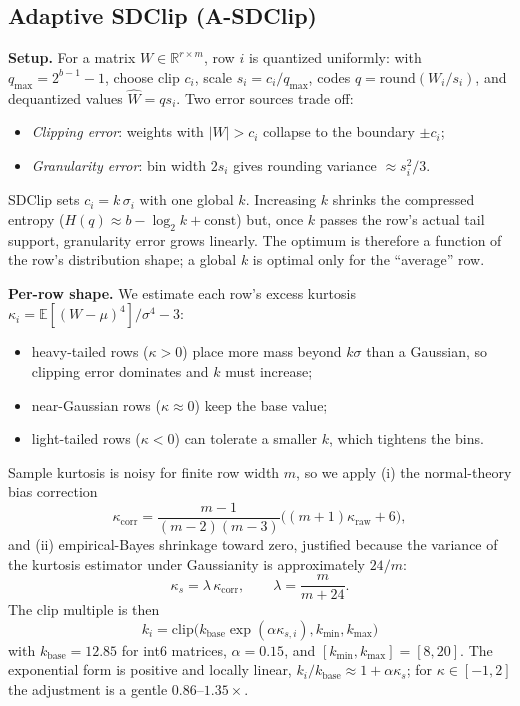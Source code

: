 \documentclass[10pt]{article}
\begin{document}
\subsection{Adaptive SDClip (A-SDClip)}

\textbf{Setup.} For a matrix $W\in\mathbb{R}^{r\times m}$, row $i$ is quantized
uniformly: with $q_{\max}=2^{b-1}-1$, choose clip $c_i$, scale
$s_i=c_i/q_{\max}$, codes $q=\mathrm{round}(W_i/s_i)$, and dequantized values
$\hat W=q s_i$. Two error sources trade off:
\begin{itemize}[leftmargin=1.6em,itemsep=0.05em]
\item \emph{Clipping error}: weights with $|W|>c_i$ collapse to the boundary $\pm c_i$;
\item \emph{Granularity error}: bin width $2s_i$ gives rounding variance $\approx s_i^2/3$.
\end{itemize}
SDClip sets $c_i=k\,\sigma_i$ with one global $k$. Increasing $k$ shrinks the compressed
entropy ($H(q)\approx b-\log_2 k+\text{const}$) but, once $k$ passes the row's actual tail
support, granularity error grows linearly. The optimum is therefore a function of the
row's distribution shape; a global $k$ is optimal only for the ``average'' row.

\textbf{Per-row shape.} We estimate each row's excess kurtosis
$\kappa_i=\mathbb{E}[(W-\mu)^4]/\sigma^4-3$:
\begin{itemize}[leftmargin=1.6em,itemsep=0.05em]
\item heavy-tailed rows ($\kappa>0$) place more mass beyond $k\sigma$ than a Gaussian, so
clipping error dominates and $k$ must increase;
\item near-Gaussian rows ($\kappa\approx 0$) keep the base value;
\item light-tailed rows ($\kappa<0$) can tolerate a smaller $k$, which tightens the bins.
\end{itemize}
Sample kurtosis is noisy for finite row width $m$, so we apply (i) the normal-theory bias
correction
\begin{equation}
\kappa_{\text{corr}}=\frac{m-1}{(m-2)(m-3)}\big((m+1)\kappa_{\text{raw}}+6\big),
\end{equation}
and (ii) empirical-Bayes shrinkage toward zero, justified because the variance of the
kurtosis estimator under Gaussianity is approximately $24/m$:
\begin{equation}
\kappa_s=\lambda\,\kappa_{\text{corr}},\qquad \lambda=\frac{m}{m+24}.
\end{equation}
The clip multiple is then
\begin{equation}
\boxed{\;k_i=\mathrm{clip}\big(k_{\text{base}}\exp(\alpha\kappa_{s,i}),
k_{\min},k_{\max}\big)\;}
\end{equation}
with $k_{\text{base}}=12.85$ for int6 matrices, $\alpha=0.15$, and $[k_{\min},k_{\max}]
=[8,20]$. The exponential form is positive and locally linear,
$k_i/k_{\text{base}}\approx 1+\alpha\kappa_s$; for $\kappa\in[-1,2]$ the adjustment is a
gentle $0.86$--$1.35\times$.
\end{document}
